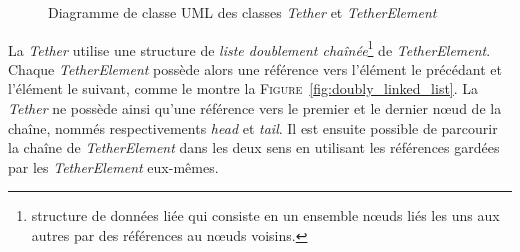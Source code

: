 				\begin{figure}[!htb]
					\centering
					\caption{Diagramme de classe UML des classes \textit{Tether} et \textit{TetherElement}}
					\label{fig:uml_class}
				\end{figure}
				
				La \textit{Tether} utilise une structure de \textit{liste doublement chaînée}\footnote{structure de données liée qui consiste en un ensemble n\oe uds liés les uns aux autres par des références au n\oe uds voisins.} de \textit{TetherElement}. Chaque \textit{TetherElement} possède alors une référence vers l'élément le précédant et l'élément le suivant, comme le montre la \textsc{Figure}~\ref{fig:doubly_linked_list}. La \textit{Tether} ne possède ainsi qu'une référence vers le premier et le dernier n\oe ud de la chaîne, nommés respectivements \textit{head} et \textit{tail}. Il est ensuite possible de parcourir la chaîne de \textit{TetherElement} dans les deux sens en utilisant les références gardées par les \textit{TetherElement} eux-mêmes. 
			
